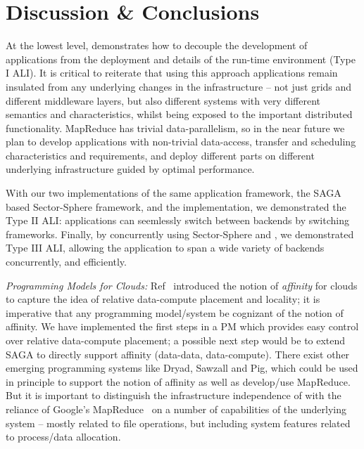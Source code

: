 \documentclass[3p,twocolumn]{elsarticle}
\begin{document}
\section{Discussion \& Conclusions}
\label{sec:discuss}


At the lowest level, \sagamapreduce demonstrates how to decouple the
development of applications from the deployment and details of the
run-time environment (Type I ALI).  It is critical to reiterate that
using this approach applications remain insulated from any underlying
changes in the infrastructure -- not just grids and different
middleware layers, but also different systems with very different
semantics and characteristics, whilst being exposed to the important
distributed functionality.  MapReduce has trivial data-parallelism, so
in the near future we plan to develop applications with non-trivial
data-access, transfer and scheduling characteristics and requirements,
and deploy different parts on different underlying infrastructure
guided by optimal performance.

With our two implementations of the same application framework, the
SAGA based Sector-Sphere framework, and the \smr implementation, we
demonstrated the Type II ALI: applications can seemlessly switch
between backends by switching frameworks.  Finally, by concurrently
using Sector-Sphere \mr and \smr, we demonstrated Type III ALI,
allowing the application to span a wide variety of backends
concurrently, and efficiently.

{\it Programming Models for Clouds: } Ref~\cite{jha_ccpe09} introduced
the notion of {\it affinity} for clouds to capture the idea of
relative data-compute placement and locality; it is imperative that
any programming model/system be cognizant of the notion of
affinity. We have implemented the first steps in a PM which provides
easy control over relative data-compute placement; a possible next
step would be to extend SAGA to directly support affinity (data-data,
data-compute).  There exist other emerging programming systems like
Dryad, Sawzall and Pig, which could be used in principle to support
the notion of affinity as well as develop/use MapReduce.  But it is
important to distinguish the infrastructure independence of
\sagamapreduce with the reliance of Google's
MapReduce~\cite{mapreduce-paper} on a number of capabilities of the
underlying system -- mostly related to file operations, but including
system features related to process/data allocation.
\end{document}
